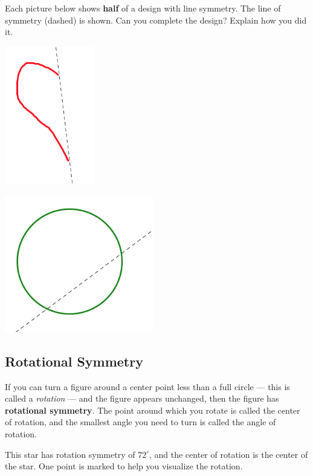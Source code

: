\newpage

\begin{problem}
Each picture below shows {\bf half} of a design with line symmetry.  The line of symmetry (dashed) is shown.  Can you complete the design?  Explain how you did it.

\begin{center}
\includegraphics[height=6cm]{complete1}

\bigskip
\bigskip

\includegraphics[height=6cm]{complete2}

\end{center}

\end{problem}


\newpage
\subsection{Rotational Symmetry}
If you can turn a figure around a center point less than a full circle --- this is called a \emph{rotation} --- and the figure appears unchanged, then the figure has {\bf rotational symmetry}. The point around which you rotate is called the center of rotation, and the smallest angle you need to turn is called the angle of rotation.

This star has rotation symmetry of $72^\circ$, and the center of rotation is the center of the star.  One point is marked to help you visualize the rotation.

